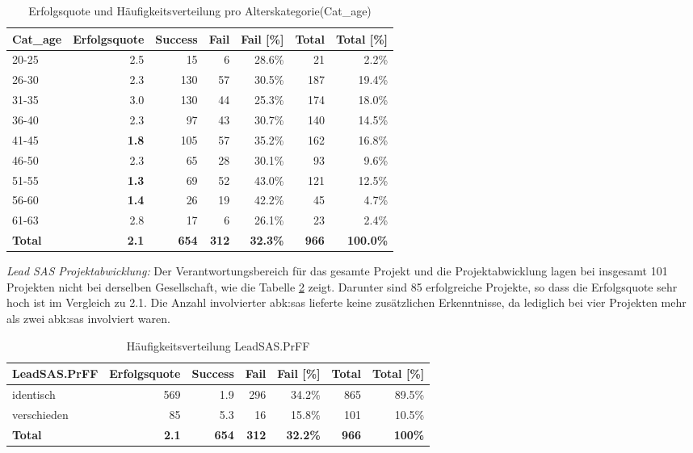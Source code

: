 \begin{table}[H]
	\centering
	\caption{Erfolgsquote und Häufigkeitsverteilung pro Alterskategorie(Cat\_age)}
	\begin{tabular}{lrrrrrr}
		\toprule
		\textbf{Cat\_age} & \multicolumn{1}{l}{\textbf{Erfolgsquote}} & \multicolumn{1}{l}{\textbf{Success}} & \multicolumn{1}{l}{\textbf{Fail}} & \multicolumn{1}{l}{\textbf{Fail [\%]}} & \multicolumn{1}{l}{\textbf{Total}} & \multicolumn{1}{l}{\textbf{Total [\%]}} \\
		\midrule
		20-25 & 2.5   & 15    & 6     & 28.6\% & 21    & 2.2\% \\
		26-30 & 2.3   & 130   & 57    & 30.5\% & 187   & 19.4\% \\
		31-35 & 3.0   & 130   & 44    & 25.3\% & 174   & 18.0\% \\
		36-40 & 2.3   & 97    & 43    & 30.7\% & 140   & 14.5\% \\
		41-45 & \textbf{1.8} & 105   & 57    & 35.2\% & 162   & 16.8\% \\
		46-50 & 2.3   & 65    & 28    & 30.1\% & 93    & 9.6\% \\
		51-55 & \textbf{1.3} & 69    & 52    & 43.0\% & 121   & 12.5\% \\
		56-60 & \textbf{1.4} & 26    & 19    & 42.2\% & 45    & 4.7\% \\
		61-63 & 2.8   & 17    & 6     & 26.1\% & 23    & 2.4\% \\
		\bottomrule
		\textbf{Total} & \textbf{2.1} & \textbf{654} & \textbf{312} & \textbf{32.3\%} & \textbf{966} & \textbf{100.0\%} \\
	\end{tabular}%
	\label{tab:fagecat}%
\end{table}%
\textit{Lead SAS Projektabwicklung: }Der Verantwortungsbereich für das gesamte Projekt und die Projektabwicklung lagen bei insgesamt 101 Projekten nicht bei derselben Gesellschaft, wie die Tabelle \ref{tab:fleadsasprff} zeigt. Darunter sind 85 erfolgreiche Projekte, so dass die Erfolgsquote sehr hoch ist im Vergleich zu 2.1. Die Anzahl involvierter \gls{abk:sas} lieferte keine zusätzlichen Erkenntnisse, da lediglich bei vier Projekten mehr als zwei \gls{abk:sas} involviert waren.
\begin{table}[H]
	\centering
	\caption{Häufigkeitsverteilung LeadSAS.PrFF}
	\begin{tabular}{lrrrrrr}
		\toprule
		\textbf{LeadSAS.PrFF} & \multicolumn{1}{l}{\textbf{Erfolgsquote}} & \multicolumn{1}{l}{\textbf{Success}} & \multicolumn{1}{l}{\textbf{Fail}} & \multicolumn{1}{l}{\textbf{Fail [\%]}} & \multicolumn{1}{l}{\textbf{Total}} & \multicolumn{1}{l}{\textbf{Total [\%]}}
		\\
		\midrule
		identisch    & 569  & 1.9 & 296   & 34.2\% & 865 & 89.5\% \\
		verschieden   & 85  & 5.3  & 16    & 15.8\% & 101 & 10.5\% \\
		\bottomrule
		\textbf{Total} & \textbf{2.1} &\textbf{654} & \textbf{312} &  \textbf{32.2\%}   & \textbf{966} & \textbf{100\%} \\
	\end{tabular}%
	\label{tab:fleadsasprff}%
\end{table}%

